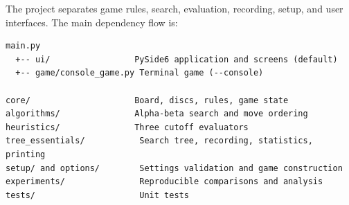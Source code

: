 \documentclass[11pt,a4paper]{article}
\begin{document}
The project separates game rules, search, evaluation, recording, setup, and user
interfaces. The main dependency flow is:

\begin{lstlisting}
main.py
  +-- ui/                 PySide6 application and screens (default)
  +-- game/console_game.py Terminal game (--console)

core/                     Board, discs, rules, game state
algorithms/               Alpha-beta search and move ordering
heuristics/               Three cutoff evaluators
tree_essentials/           Search tree, recording, statistics, printing
setup/ and options/        Settings validation and game construction
experiments/               Reproducible comparisons and analysis
tests/                     Unit tests
\end{lstlisting}
\end{document}

